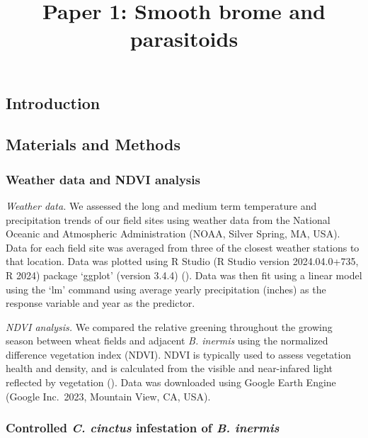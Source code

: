 \documentclass[
]{article}
\title{Paper 1: Smooth brome and parasitoids}
\author{}
\date{\vspace{-2.5em}}
\begin{document}
\maketitle

\subsection{Introduction}\label{introduction}

\subsection{Materials and Methods}\label{materials-and-methods}

\subsubsection{Weather data and NDVI
analysis}\label{weather-data-and-ndvi-analysis}

\emph{Weather data.} We assessed the long and medium term temperature
and precipitation trends of our field sites using weather data from the
National Oceanic and Atmospheric Administration (NOAA, Silver Spring,
MA, USA). Data for each field site was averaged from three of the
closest weather stations to that location. Data was plotted using R
Studio (R Studio version 2024.04.0+735, R 2024) package `ggplot'
(version 3.4.4) (). Data was then fit
using a linear model using the `lm' command using average yearly
precipitation (inches) as the response variable and year as the
predictor.

\emph{NDVI analysis.} We compared the relative greening throughout the
growing season between wheat fields and adjacent \emph{B. inermis} using
the normalized difference vegetation index (NDVI). NDVI is typically
used to assess vegetation health and density, and is calculated from the
visible and near-infared light reflected by vegetation
(). Data was
downloaded using Google Earth Engine (Google Inc.~2023, Mountain View,
CA, USA).

\subsubsection{\texorpdfstring{Controlled \emph{C. cinctus} infestation
of \emph{B.
inermis}}{Controlled C. cinctus infestation of B. inermis}}\label{controlled-c.-cinctus-infestation-of-b.-inermis}
\end{document}
